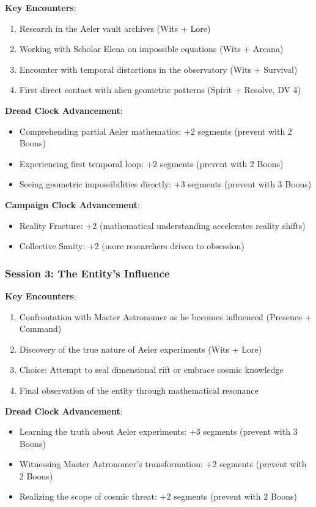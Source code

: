\documentclass[11pt]{article}
\begin{document}
\textbf{Key Encounters}:
\begin{enumerate}[leftmargin=*]
\item Research in the Aeler vault archives (Wits + Lore)
\item Working with Scholar Elena on impossible equations (Wits + Arcana)
\item Encounter with temporal distortions in the observatory (Wits + Survival)
\item First direct contact with alien geometric patterns (Spirit + Resolve, DV 4)
\end{enumerate}

\textbf{Dread Clock Advancement}:
\begin{itemize}[leftmargin=*]
\item Comprehending partial Aeler mathematics: +2 segments (prevent with 2 Boons)
\item Experiencing first temporal loop: +2 segments (prevent with 2 Boons)
\item Seeing geometric impossibilities directly: +3 segments (prevent with 3 Boons)
\end{itemize}

\textbf{Campaign Clock Advancement}:
\begin{itemize}[leftmargin=*]
\item Reality Fracture: +2 (mathematical understanding accelerates reality shifts)
\item Collective Sanity: +2 (more researchers driven to obsession)
\end{itemize}

\subsubsection*{Session 3: The Entity's Influence}

\textbf{Key Encounters}:
\begin{enumerate}[leftmargin=*]
\item Confrontation with Master Astronomer as he becomes influenced (Presence + Command)
\item Discovery of the true nature of Aeler experiments (Wits + Lore)
\item Choice: Attempt to seal dimensional rift or embrace cosmic knowledge
\item Final observation of the entity through mathematical resonance
\end{enumerate}

\textbf{Dread Clock Advancement}:
\begin{itemize}[leftmargin=*]
\item Learning the truth about Aeler experiments: +3 segments (prevent with 3 Boons)
\item Witnessing Master Astronomer's transformation: +2 segments (prevent with 2 Boons)
\item Realizing the scope of cosmic threat: +2 segments (prevent with 2 Boons)
\end{itemize}
\end{document}
